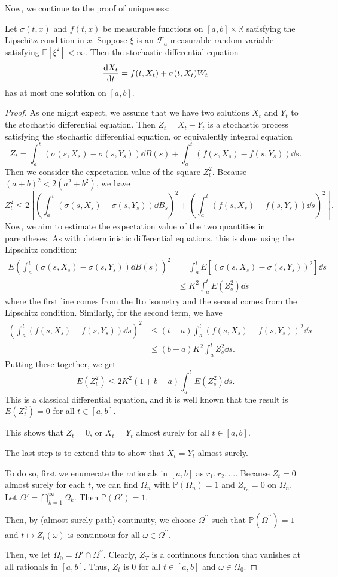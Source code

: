 \documentclass[prb,12pt]{revtex4-2}
\theoremstyle{definition}
\theoremstyle{definition}
\theoremstyle{definition}
\newcommand{\R}{\mathbb{R}}
\begin{document}
Now, we continue to the proof of uniqueness:
\begin{Theorem}
	Let $\sigma(t,x)$ and $f(t,x)$ be measurable functions on $[a,b]\times \R$ satisfying the Lipschitz condition in $x$. Suppose $\xi$ is an $\mathcal{F}_a$-measurable random variable satisfying $\mathbb{E}[\xi^2]<\infty$. Then the stochastic differential equation
	\[\dv{X_t}{t}=f(t, X_t)+\sigma(t, X_t)W_t\]
	has at most one solution on $[a,b]$.
\end{Theorem}
\begin{proof}
	As one might expect, we assume that we have two solutions $X_t$ and $Y_t$ to the stochastic differential equation. Then $Z_t=X_t-Y_t$ is a stochastic process satisfying the stochastic differential equation, or equivalently integral equation
	\[Z_t = \int_a^t (\sigma(s, X_s) - \sigma (s, Y_s))\dd{B(s)}+\int_a^t (f(s, X_s) - f(s, Y_s))\dd{s}.\]
	Then we consider the expectation value of the square $Z_t^2$. Because $(a+b)^2 < 2(a^2+b^2)$, we have
	\[Z_t^2 \le 2\left[\left(\int_a^t (\sigma(s, X_s) - \sigma(s, Y_s))\dd{B_s}\right)^2 + \left(\int_a^t (f(s, X_s) - f(s, Y_s))\dd{s}\right)^2\right].\]
	Now, we aim to estimate the expectation value of the two quantities in parentheses. As with deterministic differential equations, this is done using the Lipschitz condition:
	\begin{align*}
		E\left(\int_a^t (\sigma(s, X_s) - \sigma(s, Y_s))\dd{B(s)}\right)^2&= \int_a^t E[(\sigma(s, X_s)-\sigma(s, Y_s))^2]\dd{s}\\
		&\le K^2 \int_a^t E(Z_s^2)\dd{s}
	\end{align*} 
where the first line comes from the Ito isometry and the second comes from the Lipschitz condition. Similarly, for the second term, we have
\begin{align*}
	\left(\int_a^t (f(s, X_s) - f(s, Y_s))\dd{s}\right)^2 &\le (t-a)\int_a^t (f(s, X_s) - f(s, Y_s))^2 \dd{s}\\
	&\le (b-a)K^2 \int_a^t Z_s^2\dd{s}.
\end{align*}
Putting these together, we get
\[E(Z_t^2)\le 2K^2(1+b-a)\int_a^t E(Z_s^2)\dd{s}.\]
This is a classical differential equation, and it is well known that the result is $E(Z_t^2)=0$ for all $t\in [a,b]$.

This shows that $Z_t=0$, or $X_t=Y_t$ almost surely for all $t\in [a,b]$. 

The last step is to extend this to show that $X_t=Y_t$ almost surely.

To do so, first we enumerate the rationals in $[a,b]$ as $r_1,r_2, \dots$. Because $Z_t=0$ almost surely for each $t$, we can find $\Omega_n$ with $\mathbb{P}(\Omega_n)=1$ and $Z_{r_n}=0$ on $\Omega_n$. Let $\Omega' = \bigcap_{k=1}^\infty \Omega_k$. Then $\mathbb{P}(\Omega')=1$.

Then, by (almost surely path) continuity, we choose $\Omega^{\prime\prime}$ such that $\mathbb{P}(\Omega^{\prime\prime})=1$ and $t\mapsto Z_t(\omega)$ is continuous for all $\omega\in \Omega^{\prime\prime}$.

Then, we let $\Omega_0=\Omega'\cap \Omega^{\prime\prime}$. Clearly, $Z_T$ is a continuous function that vanishes at all rationals in $[a,b]$. Thus, $Z_t$ is $0$ for all $t\in [a,b]$ and $\omega\in \Omega_0$.
\end{proof}
\end{document}
